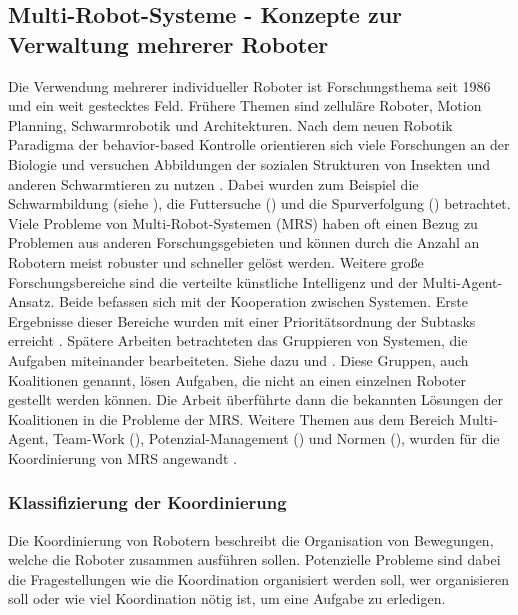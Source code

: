 \subsection{Multi-Robot-Systeme - Konzepte zur Verwaltung mehrerer Roboter}
\label{sec:relatedwork-multirobots}
    
Die Verwendung mehrerer individueller Roboter ist Forschungsthema seit 1986 und ein weit gestecktes Feld. Frühere Themen sind zelluläre Roboter, Motion Planning, Schwarmrobotik und Architekturen. Nach dem neuen Robotik Paradigma der behavior-based Kontrolle orientieren sich viele Forschungen an der Biologie und versuchen Abbildungen der sozialen Strukturen von Insekten und anderen Schwarmtieren zu nutzen \citep{parker2003current}. Dabei wurden zum Beispiel die Schwarmbildung (siehe \cite{hayes2002self}), die Futtersuche (\cite{balch1999impact}) und die Spurverfolgung (\cite{vaughan2000whistling}) betrachtet. Viele Probleme von Multi-Robot-Systemen (MRS) haben oft einen Bezug zu Problemen aus anderen Forschungsgebieten und können durch die Anzahl an Robotern meist robuster und schneller gelöst werden. Weitere große Forschungsbereiche sind die verteilte künstliche Intelligenz und der Multi-Agent-Ansatz. Beide befassen sich mit der Kooperation zwischen Systemen. Erste Ergebnisse dieser Bereiche wurden mit einer Prioritätsordnung der Subtasks erreicht \citep{durfee1987coherent}. Spätere Arbeiten betrachteten das Gruppieren von Systemen, die Aufgaben miteinander bearbeiteten. Siehe dazu \cite{shehory1998methods} und \cite{lau2003task}. Diese Gruppen, auch Koalitionen genannt, lösen Aufgaben, die nicht an einen einzelnen Roboter gestellt werden können. Die Arbeit \cite{vig2005issues} überführte dann die bekannten Lösungen der Koalitionen in die Probleme der MRS. Weitere Themen aus dem Bereich Multi-Agent, Team-Work (\cite{pynadath2003automated}), Potenzial-Management (\cite{timm2003ontology}) und Normen (\cite{boella2002norms}), wurden für die Koordinierung von MRS angewandt \citep{lundh2006plan}.

\subsubsection{Klassifizierung der Koordinierung}
Die Koordinierung von Robotern beschreibt die Organisation von Bewegungen, welche die Roboter zusammen ausführen sollen. Potenzielle Probleme sind dabei die Fragestellungen wie die Koordination organisiert werden soll, wer organisieren soll oder wie viel Koordination nötig ist, um eine Aufgabe zu erledigen.

